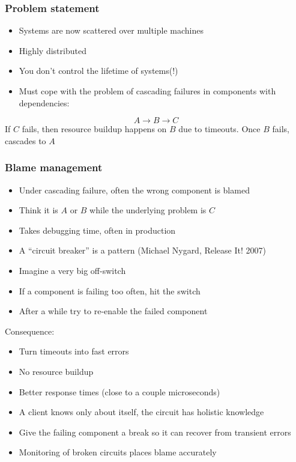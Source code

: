 \documentclass[lualatex]{beamer}
\begin{document}
\begin{frame}
  \frametitle{Problem statement}
  \begin{itemize}
  \item Systems are now scattered over multiple machines
  \item Highly distributed
  \item You don't control the lifetime of systems(!)
  \item Must cope with the problem of cascading failures in components
    with dependencies:
  \end{itemize}
  \begin{equation}
    \label{eq:1}
    A \to B \to C
  \end{equation}
  If $C$ fails, then resource buildup happens on $B$ due to timeouts. Once $B$ fails,
  cascades to $A$
\end{frame}

\begin{frame}
  \frametitle{Blame management}
  \begin{itemize}
  \item Under cascading failure, often the wrong component is blamed
  \item Think it is $A$ or $B$ while the underlying problem is $C$
  \item Takes debugging time, often in production
  \end{itemize}
\end{frame}

\begin{frame}
  \begin{itemize}
  \item A ``circuit breaker'' is a pattern (Michael Nygard, Release
    It! 2007)
  \item Imagine a very big off-switch
  \item If a component is failing too often, hit the switch
  \item After a while try to re-enable the failed component
  \end{itemize}
\end{frame}
\begin{frame}
  Consequence:
  \begin{itemize}
  \item Turn timeouts into fast errors
  \item No resource buildup
  \item Better response times (close to a couple microseconds)
  \item A client knows only about itself, the circuit has holistic
    knowledge
  \item Give the failing component a break so it can recover from
    transient errors
  \item Monitoring of broken circuits places blame accurately
  \end{itemize}
\end{frame}
\end{document}
